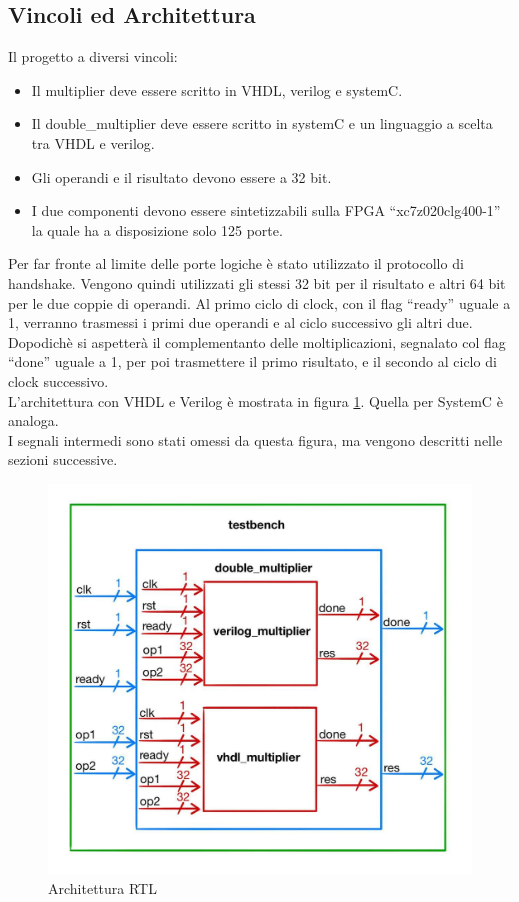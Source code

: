 \documentclass[]{IEEEtran}
\begin{document}
\subsection{Vincoli ed Architettura}
Il progetto a diversi vincoli:
\begin{itemize}
    \item Il multiplier deve essere scritto in VHDL, verilog e systemC.
    \item Il double\_multiplier deve essere scritto in systemC e un linguaggio a scelta tra VHDL e verilog.
    \item Gli operandi e il risultato devono essere a 32 bit.
    \item I due componenti devono essere sintetizzabili sulla FPGA ``xc7z020clg400-1'' la quale ha a disposizione solo 125 porte.
\end{itemize}
Per far fronte al limite delle porte logiche è stato utilizzato il protocollo di handshake. Vengono quindi utilizzati gli stessi 32 bit per il risultato e altri 64 bit per le due coppie di operandi. Al primo ciclo di clock, con il flag ``ready'' uguale a 1, verranno trasmessi i primi due operandi e al ciclo successivo gli altri due. Dopodichè si aspetterà il complementanto delle moltiplicazioni, segnalato col flag ``done'' uguale a 1, per poi trasmettere il primo risultato, e il secondo al ciclo di clock successivo.
\\L'architettura con VHDL e Verilog è mostrata in figura \ref{fig:Architettura}. Quella per SystemC è analoga. 
\\I segnali intermedi sono stati omessi da questa figura, ma vengono descritti nelle sezioni successive.
\begin{figure}[!htb]
    \centering
    \includegraphics[width=0.8\linewidth]{figures/architettura.jpg}
    \caption{Architettura RTL}
    \label{fig:Architettura}
\end{figure}
\end{document}
